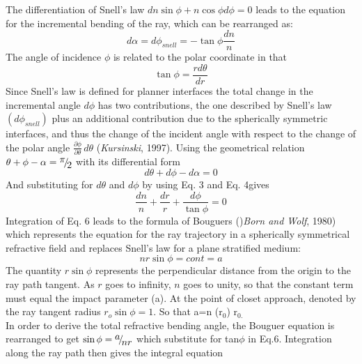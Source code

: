 \documentclass[a4paper,12pt,twoside]{article}
\begin{document}
\noindent The differentiation of Snell's law $dn\sin\phi + n\cos\phi d\phi=0$ leads to the equation for the incremental bending of the ray, which can be rearranged as:
\begin{equation}
	d\alpha =d\phi _{snell} =-\tan \phi \frac{dn}{n} 
\end{equation}
The angle of incidence $\phi $  is related to the polar coordinate in that
\begin{equation}
	\tan \phi =\frac{rd\theta }{dr}
\end{equation}
Since Snell's law is defined for planner interfaces the total change in the incremental angle $d\phi $ has two contributions, the one described by Snell's law $\left(d\phi _{snell} \right)$ plus an additional contribution due to the spherically symmetric interfaces, and thus the change of the incident angle with respect to the change of the polar angle $\frac{\partial \phi }{\partial \theta } \, d\theta$ (\textit{Kursinski}, 1997). Using the geometrical relation $\theta +\phi -\alpha ={\raise0.7ex\hbox{$ \pi  $}\!\mathord{\left/{\vphantom{\pi  2}}\right.\kern-\nulldelimiterspace}\!\lower0.7ex\hbox{$ 2 $}} $ with its differential form
\begin{equation}
	d\theta +d\phi - d\alpha =0 
\end{equation}
And substituting for $d\theta$ and $d\phi$ by using Eq. 3 and Eq. 4gives
\begin{equation}
	\frac{dn}{n} +\frac{dr}{r} +\frac{d\phi }{\tan \phi } =0 
\end{equation}
Integration of Eq. 6 leads to the formula of Bouguers ()\textit{Born and Wolf}, 1980) which represents the equation for the ray trajectory in a spherically symmetrical refractive field and replaces Snell's law for a plane stratified medium:
\begin{equation}
	nr\sin\phi =cont=a 
\end{equation}                                   
\noindent The quantity $r\sin \phi$ represents the perpendicular distance from the origin to the ray path tangent. As $ r$  goes to infinity, $n$ goes to unity, so that the constant term must equal the impact parameter (a). At the point of closet approach, denoted by the ray tangent radius $r_{o} \sin\phi =1$. So that a=n (r${}_{0}$) r${}_{0.}$ \\

\noindent In order to derive the total refractive bending angle, the Bouguer equation is rearranged to get $\sin\phi ={\raise0.7ex\hbox{$ a $}\!\mathord{\left/{\vphantom{a nr}}\right.\kern-\nulldelimiterspace}\!\lower0.7ex\hbox{$ nr $}} $ which substitute for tan$\phi $ in Eq.6. Integration along the ray path then gives the integral equation
\end{document}
